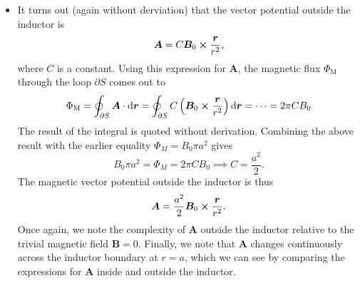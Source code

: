 \documentclass[11pt, a4paper]{article}
\newcommand{\diff}{\mathop{}\!\mathrm{d}} %
\renewcommand{\vec}[1]{\bm{#1}} %
\renewcommand{\r}{\vec{r}}
\newcommand{\B}{\vec{B}} %
\newcommand{\A}{\vec{A}} %
\begin{document}
\begin{itemize}
	\item It turns out (again without derviation) that the vector potential outside the inductor is
	\begin{equation*}
		\A = C \B_{0} \cross \frac{\r}{r^{2}},
	\end{equation*}
	where $ C $ is a constant. Using this expression for $ \A $, the magnetic flux $ \Phi_{\text{M}} $ through the loop $ \partial S $ comes out to
	\begin{equation*}
		\Phi_{\text{M}} = \oint_{\partial S} \A \cdot \diff \r  = \oint_{\partial S} C\left(\B_{0} \cross \frac{\r}{r^{2}}\right) \diff \r = \cdots = 2\pi C B_{0}
	\end{equation*}
	The result of the integral is quoted without derivation. Combining the above result with the earlier equality $ \Phi_{M} = B_{0}\pi a^{2} $ gives
	\begin{equation*}
		B_{0}\pi a^{2} = \Phi_{M} = 2\pi C B_{0} \implies C = \frac{a^{2}}{2}.
	\end{equation*}
	The magnetic vector potential outside the inductor is thus
	\begin{equation*}
		\A = \frac{a^{2}}{2} \B_{0} \cross \frac{\r}{r^{2}}.
	\end{equation*}
    Once again, we note the complexity of $ \A $ outside the inductor relative to the trivial magnetic field $ \B = 0 $. Finally, we note that $ \A $ changes continuously across the inductor boundary at $ r = a $, which we can see by comparing the expressions for $ \A $ inside and outside the inductor.

\end{itemize}
\end{document}

